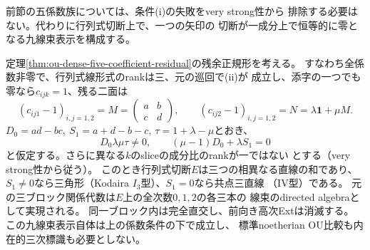 前節の五係数族については、条件(i)の失敗をvery strong性から
排除する必要はない。代わりに行列式切断上で、一つの矢印の
切断が一成分上で恒等的に零となる九線束表示を構成する。

\begin{theorem}[残余五係数族の九線束表示]
\label{thm:ou-dense-residual-three-lines}
定理\ref{thm:ou-dense-five-coefficient-residual}の残余正規形を考える。
すなわち全係数非零で、行列式線形式のrankは三、元の巡回で(ii)が
成立し、添字の一つでも零なら$c_{ijk}=1$、残る二面は
\[
 (c_{ij1}-1)_{i,j=1,2}=M=\begin{pmatrix}a&b\\c&d\end{pmatrix},
 \qquad
 (c_{ij2}-1)_{i,j=1,2}=N=\lambda\mathbf1+\mu M.
\]
$D_0=ad-bc,\ S_1=a+d-b-c,\ \tau=1+\lambda-\mu$とおき、
\[
 D_0\lambda\mu\tau\ne0,\qquad (\mu-1)D_0+\lambda S_1=0
\]
と仮定する。さらに異なる$k$のsliceの成分比のrankが一ではない
とする（very strong性から従う）。
このとき行列式切断$E$は三つの相異なる直線の和であり、
$S_1\ne0$なら三角形（Kodaira $I_3$型）、$S_1=0$なら共点三直線
（IV型）である。
元の三ブロック関係代数は$E$上の全次数$0,1,2$の各三本の
線束のdirected algebraとして実現される。
同一ブロック内は完全直交し、前向き高次Extは消滅する。
この九線束表示自体は上の係数条件の下で成立し、
標準noetherian OU比較も内在的三次標識も必要としない。
\end{theorem}

